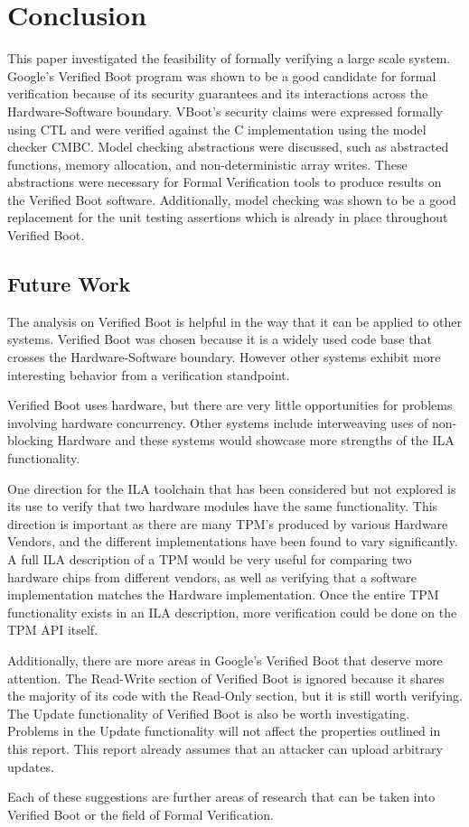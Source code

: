 \chapter{Conclusion}

This paper investigated the feasibility of formally verifying a large scale system.
Google's Verified Boot program was shown to be a good candidate for formal verification because of its security guarantees and its interactions across the Hardware-Software boundary.
VBoot's security claims were expressed formally using CTL and were verified against the C implementation using the model checker CMBC\@. 
Model checking abstractions were discussed, such as abstracted functions, memory
allocation, and non-deterministic array writes.
These abstractions were necessary for Formal Verification tools to produce
results on the Verified Boot software.
Additionally, model checking was shown to be a good replacement for the unit
testing assertions which is already in place throughout Verified Boot.

\section{Future Work}

The analysis on Verified Boot is helpful in the way that it can be applied to
other systems. 
Verified Boot was chosen because it is a widely used code base
that crosses the Hardware-Software boundary. 
However other systems exhibit more interesting behavior from a verification standpoint.

Verified Boot uses hardware, but there are very little opportunities for
problems involving hardware concurrency.
Other systems include interweaving uses of non-blocking
Hardware\cite{load-protocol} and these systems would showcase more strengths of the ILA functionality. 

One direction for the ILA toolchain that has been considered but not explored
is its use to verify that two hardware modules have the same functionality.
This direction is important as there are many TPM's produced by various Hardware
Vendors\cite{atmel-tpm}\cite{broadcom-tpm}\cite{infineon-tpm}, and the different 
implementations have been found to vary significantly\cite{tcg-inside}.
A full ILA description of a TPM would be very useful for comparing two hardware
chips from different vendors, as well as verifying that a software
implementation matches the Hardware implementation. 
Once the entire TPM functionality exists in an ILA description, more
verification could be done on the TPM API
itself\cite{TPM-state}\cite{TPM-spec-verif}.

Additionally, there are more areas in Google's Verified Boot that
deserve more attention. 
The Read-Write section of Verified Boot is ignored because it shares the
majority of its code with the Read-Only section, but it is still worth verifying. 
The Update functionality of Verified Boot is also be worth investigating.
Problems in the Update functionality will not affect the properties outlined in this report.
This report already assumes that an attacker can upload arbitrary updates.

Each of these suggestions are further areas of research that can be taken into Verified Boot or the field of Formal Verification.
